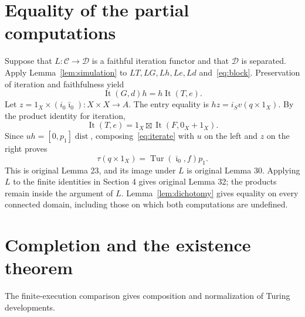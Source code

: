 \documentclass[11pt]{article}
\newcommand{\C}{\mathcal C}\newcommand{\D}{\mathcal D}\newcommand{\B}{\mathcal B}
\newcommand{\It}{\operatorname{It}}\newcommand{\Tur}{\operatorname{Tur}}
\newcommand{\dist}{\operatorname{dist}}\newcommand{\ass}{\operatorname{ass}}
\begin{document}
\section{Equality of the partial computations}
Suppose that $L:\C\to\D$ is a faithful iteration functor and that $\D$ is separated. Apply Lemma~\ref{lem:simulation} to $LT,LG,Lh,Le,Ld$ and~\eqref{eq:block}. Preservation of iteration and faithfulness yield
\begin{equation}\label{eq:iterate}
\It(G,d)h=h\It(T,e).
\end{equation}
Let $z=1_X\times(i_0\bar\imath_0):X\times X\to A$. The entry equality is $hz=i_Sv(q\times1_X)$. By the product identity for iteration,
\[
\It(T,e)=1_X\boxtimes\It(F,0_X+1_X).
\]
Since $uh=[0,p_1]\dist$, composing~\eqref{eq:iterate} with $u$ on the left and $z$ on the right proves
\begin{equation}\label{eq:weak}
\tau(q\times1_X)=\Tur(\bar\imath_0,f)p_1.
\end{equation}
This is original Lemma 23, and its image under $L$ is original Lemma 30. Applying $L$ to the finite identities in Section 4 gives original Lemma 32; the products remain inside the argument of $L$. Lemma~\ref{lem:dichotomy} gives equality on every connected domain, including those on which both computations are undefined.

\section{Completion and the existence theorem}\label{sec:completion}
The finite-execution comparison gives composition and normalization of Turing developments.
\end{document}
